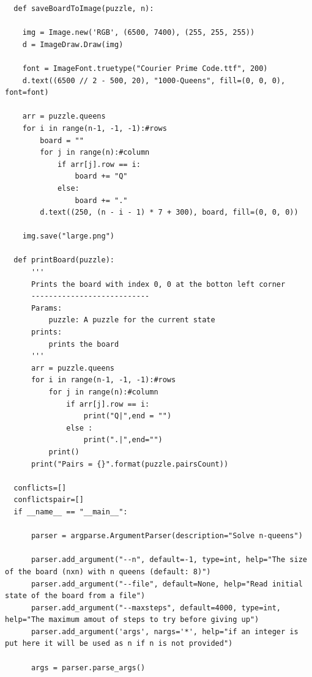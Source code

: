 \documentclass{article}
\begin{document}
\begin{verbatim}
  def saveBoardToImage(puzzle, n):
  
    img = Image.new('RGB', (6500, 7400), (255, 255, 255))
    d = ImageDraw.Draw(img)
    
    font = ImageFont.truetype("Courier Prime Code.ttf", 200)
    d.text((6500 // 2 - 500, 20), "1000-Queens", fill=(0, 0, 0), font=font)

    arr = puzzle.queens
    for i in range(n-1, -1, -1):#rows 
        board = ""
        for j in range(n):#column
            if arr[j].row == i:
                board += "Q"
            else:
                board += "."
        d.text((250, (n - i - 1) * 7 + 300), board, fill=(0, 0, 0))

    img.save("large.png")
  
  def printBoard(puzzle):
      '''
      Prints the board with index 0, 0 at the botton left corner
      ---------------------------
      Params:
          puzzle: A puzzle for the current state
      prints:
          prints the board
      '''
      arr = puzzle.queens
      for i in range(n-1, -1, -1):#rows 
          for j in range(n):#column
              if arr[j].row == i: 
                  print("Q|",end = "")
              else : 
                  print(".|",end="")
          print()
      print("Pairs = {}".format(puzzle.pairsCount))
  
  conflicts=[]
  conflictspair=[]
  if __name__ == "__main__": 
  
      parser = argparse.ArgumentParser(description="Solve n-queens")
  
      parser.add_argument("--n", default=-1, type=int, help="The size of the board (nxn) with n queens (default: 8)")
      parser.add_argument("--file", default=None, help="Read initial state of the board from a file")
      parser.add_argument("--maxsteps", default=4000, type=int, help="The maximum amout of steps to try before giving up")
      parser.add_argument('args', nargs='*', help="if an integer is put here it will be used as n if n is not provided")
  
      args = parser.parse_args()
   \end{verbatim}
\newpage
\end{document}
